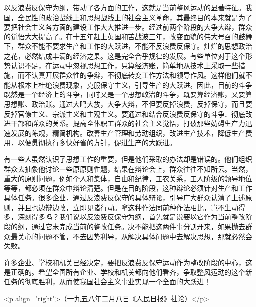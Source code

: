 以反浪费反保守为纲，带动了各方面的工作，这就是当前整风运动的显著特征。我国，全民性的政治战线上和思想战线上的社会主义革命，其最终目的本来就是为了要把社会主义各方面的建设工作大大推进一步。经过前两个阶段的大争大辩，群众的觉悟大大提高了。在十五年赶上英国和苦战波三年，改变面貌的伟大号召的鼓舞下，群众不能不要求生产和工作的大跃进，不能不反浪费反保守。灿烂的思想政治之花，必然结成丰满的经济之果。这是完全合乎规律的发展。有些单位对于这个形势认识不足，在运动中忽视思想工作，只算经济账，简单地从技术上采取一些措施，而不认真开展群众性的争辩，不彻底转变工作方法和领导作风。这样他们就不能从根本上杜绝浪费现象，克服保守主义，引导生产的大跃进。因此，目前的斗争既然是一个经济上的斗争，同时又是一个思想政治的斗争，既要算经济账，又要算思想账、政治账。通过大鸣大放，大争大辩，不但要反掉浪费，反掉保守，而且要反掉官僚主义、宗派主义和主观主义。要通过和结合反浪费反保守的斗争．彻底改进干部和群众的关系。提高全体职工群众的社会主义觉悟，打破那些妨碍生产力迅速发展的陈规，精简机构。改善生产管理和劳动组织，改进生产技术，降低生产费用．以便贯彻执行多快好省的方针，促进生产的大跃进。

有一些人虽然认识了思想工作的重要，但是他们采取的办法却是错误的。他们组织群众去抽象他讨论一些原原则性题，结果在辩论会上，群众往往不知所云。当然，重大的原则问题，例如个人和集体，自由和纪律，工农关系，工人阶级的领导地位等等，都必须在群众中辩论清楚。但是在目的阶段，这种辩论必须针对生产和工作具体任务。很多企业．通过反浪费反保守的具体辩论，引导广大群众认清了上述原则，并且也边辩边改，立即见诸行动。拿这种作法同前种作法相比，岂不生动得多，深刻得多吗？我们说以反浪费反保守为纲，首先就是说要以它作为当前整改阶段的纲，通过它末完成当前的整改任务。决不能把这两件事分割开来，如果抛去群众最关心的问题不管，不去因势利导，从解决具体问题中去解决思想，那就必然会失败。

许多企业、学校和机关已经决定，要把反浪费反保守运动作为整改阶段的中心，这是正确的。希望全国所有企业、学校和机关都向他们看齐，争取整风运动的这个新任务的彻底胜利，从而使我国社会主义事业实现一个全面的大跃进！

<p align="right">（一九五八年二月八日《人民日报》社论）</p>


